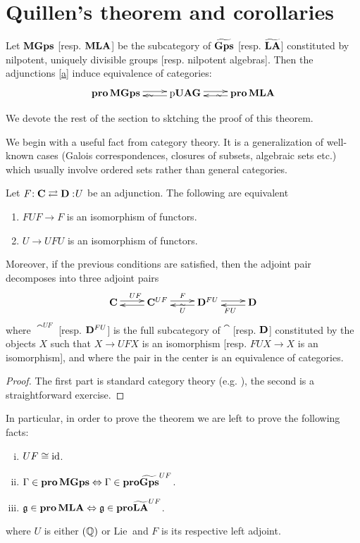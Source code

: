 \section{Quillen's theorem and corollaries}

\begin{thm}[Quillen]Let $\operatorname{\bf{MGps}}$ [resp. $\operatorname{\bf{MLA}}$] be the subcategory of $\widetilde{\operatorname{\bf{Gps}}}$ [resp. $\widetilde{\operatorname{\bf{LA}}}$] constituted by nilpotent, uniquely divisible groups [resp. nilpotent algebras]. Then the adjunctions \eqref{a} induce equivalence of categories:
$$\xymatrix{{\bf{pro}}\MGps\ar@<0.5ex>[r]_\sim&\pUAG\ar@<0.5ex>[l]\ar@<0.5ex>[r]_\sim&{\bf{pro}}\MLA\ar@<0.5ex>[l]}$$
\end{thm}

We devote the rest of the section to sktching the proof of this theorem.

We begin with a useful fact from category theory. It is a generalization of well-known cases (Galois correspondences, closures of subsets, algebraic sets etc.) which usually involve ordered sets rather than general categories.

\begin{prop}\label{formal}
Let $F\negmedspace: \mathbf{C}\rightleftarrows \mathbf{D}:\negmedspace U$ be an adjunction. The following are equivalent
\begin{enumerate}
	\item $FUF\to F$ is an isomorphism of functors.
	\item $U\to UFU$ is an isomorphism of functors.
\end{enumerate}
Moreover, if the previous conditions are satisfied, then the adjoint pair decomposes into three adjoint pairs
$$\xymatrix{\cat\ar@<0.5ex>[r]^{UF}&\cat^{UF}\ar@<0.5ex>[l]\ar@<0.5ex>[r]^{F}_\sim&\catd^{FU}\ar@<0.5ex>[l]^{U}\ar@<0.5ex>[r]&\catd\ar@<0.5ex>[l]^{FU}}$$
where $\cat^{UF}$ [resp. $\mathbf{D}^{FU}$] is the full subcategory of $	\cat$ [resp. $\mathbf{D}$] constituted by the objects $X$ such that $X\to UFX$ is an isomorphism [resp. $FUX\to X$ is an isomorphism], and where the pair in the center is an equivalence of categories.
\end{prop}

\begin{proof}
The first part is standard category theory (e.g. \cite[Lemma 4.3]{ls}), the second is a straightforward exercise.
\end{proof}
In particular, in order to prove the theorem we are left to prove the following facts:
\begin{enumerate}[(i)]
	\item $UF\cong\mathrm{id}$.
	\item $\Gamma\in{\bf{pro}}\operatorname{\bf{MGps}}\Leftrightarrow\Gamma\in {\bf{pro}}\widetilde{\operatorname{\bf{Gps}}}^{UF}$.
	\item $\mathfrak{g}\in{\bf{pro}}\operatorname{\bf{MLA}}\Leftrightarrow\mathfrak{g}\in {\bf{pro}}\widetilde{\operatorname{\bf{LA}}}^{UF}$.
\end{enumerate}
where $U$ is either $(\mathbb{Q})$ or $\mathrm{Lie~}$ and $F$ is its respective left adjoint.

